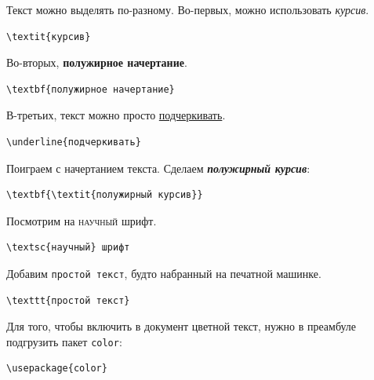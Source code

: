 \documentclass[12pt]{article}
\begin{document}
Текст можно выделять по-разному. Во-первых, можно использовать \textit{курсив}. 

\begin{center}
\begin{BVerbatim}
\textit{курсив}
\end{BVerbatim}
\end{center}


Во-вторых, \textbf{полужирное начертание}. 

\begin{center}
\begin{BVerbatim}
\textbf{полужирное начертание}
\end{BVerbatim}
\end{center}

В-третьих, текст можно просто \underline{подчеркивать}. 

\begin{center}
\begin{BVerbatim}
\underline{подчеркивать}
\end{BVerbatim}
\end{center}

Поиграем с начертанием текста. Сделаем \textbf{\textit{полужирный курсив}}:

\begin{center}
\begin{BVerbatim}
\textbf{\textit{полужирный курсив}}
\end{BVerbatim}
\end{center}

Посмотрим на \textsc{научный} шрифт. 

\begin{center}
\begin{BVerbatim}
\textsc{научный} шрифт
\end{BVerbatim}
\end{center}

Добавим \texttt{простой текст}, будто набранный на печатной машинке. 

\begin{center}
\begin{BVerbatim}
\texttt{простой текст}
\end{BVerbatim}
\end{center}

Для того, чтобы включить в документ цветной текст, нужно в преамбуле подгрузить пакет \texttt{color}:

\begin{center}
\begin{BVerbatim}
\usepackage{color}
\end{BVerbatim}
\end{center}
\end{document}
